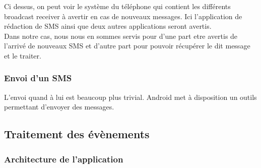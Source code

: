 Ci dessus, on peut voir le système du téléphone qui contient les différents broadcast receiver à avertir
en cas de nouveaux messages. Ici l'application de rédaction de SMS ainsi que deux autres applications seront
avertis.
\\
Dans notre cas, nous nous en sommes servis pour d'une part etre avertis de l'arrivé de nouveaux SMS et d'autre 
part pour pouvoir récupérer le dit message et le traiter.
\\

\subsubsection{Envoi d'un SMS}

L'envoi quand à lui est beaucoup plus trivial. Android met à disposition un outils permettant d'envoyer
des messages.


\subsection{Traitement des évènements}



\subsubsection{Architecture de l'application}

